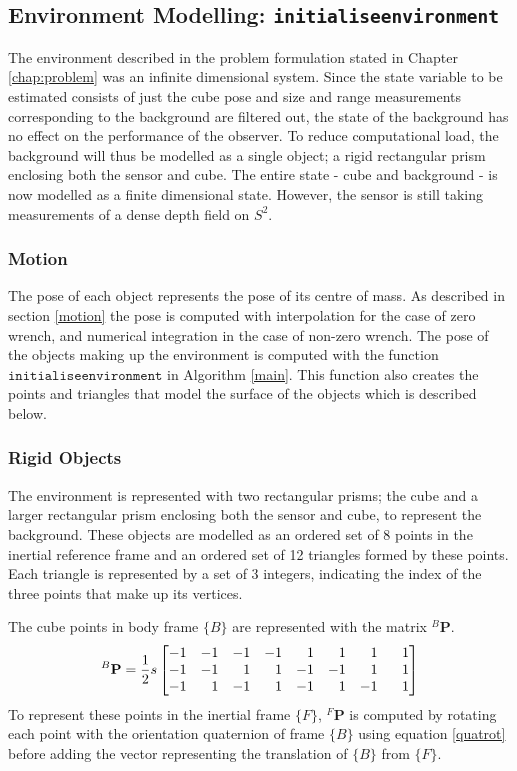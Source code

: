 \subsection{Environment Modelling: \texttt{initialiseenvironment}}
The environment described in the problem formulation stated in Chapter \ref{chap:problem} was an infinite dimensional system. Since the state variable to be estimated consists of just the cube pose and size and range measurements corresponding to the background are filtered out, the state of the background has no effect on the performance of the observer. 
To reduce computational load, the background will thus be modelled as a single object; a rigid rectangular prism enclosing both the sensor and cube. 
The entire state - cube and background - is now modelled as a finite dimensional state. However, the sensor is still taking measurements of a dense depth field on $S^2$.

\subsubsection{Motion}
The pose of each object represents the pose of its centre of mass. As described in section \ref{motion} the pose is computed with interpolation for the case of zero wrench, and numerical integration in the case of non-zero wrench. The pose of the objects making up the environment is computed with the function $\texttt{initialiseenvironment}$ in Algorithm \ref{main}. This function also creates the points and triangles that model the surface of the objects which is described below.

\subsubsection{Rigid Objects}
The environment is represented with two rectangular prisms; the cube and a larger rectangular prism enclosing both the sensor and cube, to represent the background. These objects are modelled as an ordered set of 8 points in the inertial reference frame and an ordered set of 12 triangles formed by these points. Each triangle is represented by a set of 3 integers, indicating the index of the three points that make up its vertices.

The cube points in body frame $\{B\}$ are represented with the matrix ${^{B}\mathbf{P}}$.
\begin{equation}
	{^{B}\mathbf{P}} = \frac{1}{2}s
	\begin{bmatrix*}[r]
		-1  &  -1  &  -1  &  -1  &   1  &   1  &   1  &  \hspace{0.75em} 1 \\
		-1  &  -1  &   1  &   1  &  -1  &  -1  &   1  &  1 \\
		-1  &   1  &  -1  &   1  &  -1  &   1  &  -1  &  1 
	\end{bmatrix*}
\end{equation}
To represent these points in the inertial frame $\{F\}$, ${^{F}\mathbf{P}}$ is computed by rotating each point with the orientation quaternion of frame $\{B\}$ using equation \ref{quatrot} before adding the vector representing the translation of $\{B\}$ from $\{F\}$.

